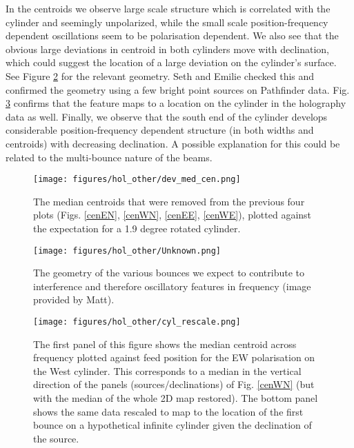 In the centroids we observe large scale structure which is correlated with the cylinder and seemingly unpolarized, while the small scale position-frequency dependent oscillations seem to be polarisation dependent. We also see that the obvious large deviations in centroid in both cylinders move with declination, which could suggest the location of a large deviation on the cylinder's surface. See Figure \ref{unknown} for the relevant geometry. Seth and Emilie checked this and confirmed the geometry using a few bright point sources on Pathfinder data. Fig. \ref{confirm} confirms that the feature maps to a location on the cylinder in the holography data as well. Finally, we observe that the south end of the cylinder develops considerable position-frequency dependent structure (in both widths and centroids) with decreasing declination. A possible explanation for this could be related to the multi-bounce nature of the beams.

\begin{figure}[h!]
\begin{center}
\texttt{[image: figures/hol\_other/dev\_med\_cen.png]}
\end{center}
\caption{The median centroids that were removed from the previous four plots (Figs. \ref{cenEN}, \ref{cenWN}, \ref{cenEE}, \ref{cenWE}), plotted against the expectation for a 1.9 degree rotated cylinder.}
\label{devmedcen}
\end{figure}

\begin{figure}[h!]
\begin{center}
\texttt{[image: figures/hol\_other/Unknown.png]}
\end{center}
\caption{The geometry of the various bounces we expect to contribute to interference and therefore oscillatory features in frequency (image provided by Matt).}
\label{unknown}
\end{figure}

\begin{figure}[h!]
\begin{center}
\texttt{[image: figures/hol\_other/cyl\_rescale.png]}
\end{center}
\caption{The first panel of this figure shows the median centroid across frequency plotted against feed position for the EW polarisation on the West cylinder. This corresponds to a median in the vertical direction of the panels (sources/declinations) of Fig. \ref{cenWN} (but with the median of the whole 2D map restored). The bottom panel shows the same data rescaled to map to the location of the first bounce on a hypothetical infinite cylinder given the declination of the source.}
\label{confirm}
\end{figure}

